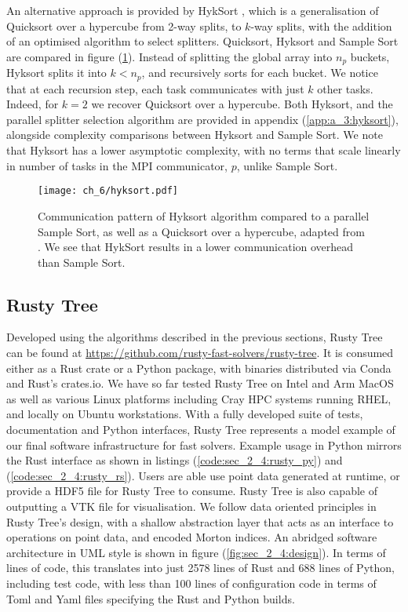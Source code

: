 An alternative approach is provided by HykSort \cite{sundar2013hyksort}, which is a generalisation of Quicksort over a hypercube \cite{wagar1987hyperquicksort} from 2-way splits, to $k$-way splits, with the addition of an optimised algorithm to select splitters. Quicksort, Hyksort and Sample Sort are compared in figure (\ref{fig:sec_2_4:hyksort}). Instead of splitting the global array into $n_p$ buckets, Hyksort splits it into $k < n_p$, and recursively sorts for each bucket. We notice that at each recursion step, each task communicates with just $k$ other tasks. Indeed, for $k=2$ we recover Quicksort over a hypercube. Both Hyksort, and the parallel splitter selection algorithm are provided in appendix (\ref{app:a_3:hyksort}), alongside complexity comparisons between Hyksort and Sample Sort. We note that Hyksort has a lower asymptotic complexity, with no terms that scale linearly in number of tasks in the MPI communicator, $p$, unlike Sample Sort.

\begin{figure}
    \centerline{\texttt{[image: ch\_6/hyksort.pdf]}}
    \caption{Communication pattern of Hyksort algorithm compared to a parallel Sample Sort, as well as a Quicksort over a hypercube, adapted from \cite{sundar2013hyksort}. We see that HykSort results in a lower communication overhead than Sample Sort.}
    \label{fig:sec_2_4:hyksort}
\end{figure}

\subsection*{Rusty Tree}

Developed using the algorithms described in the previous sections, Rusty Tree can be found at \url{https://github.com/rusty-fast-solvers/rusty-tree}. It is consumed either as a Rust crate or a Python package, with binaries distributed via Conda and Rust's crates.io. We have so far tested Rusty Tree on Intel and Arm MacOS as well as various Linux platforms including Cray HPC systems running RHEL, and locally on Ubuntu workstations. With a fully developed suite of tests, documentation and Python interfaces, Rusty Tree represents a model example of our final software infrastructure for fast solvers. Example usage in Python mirrors the Rust interface as shown in listings (\ref{code:sec_2_4:rusty_py}) and (\ref{code:sec_2_4:rusty_rs}). Users are able use point data generated at runtime, or provide a HDF5 file for Rusty Tree to consume. Rusty Tree is also capable of outputting a VTK file for visualisation.  We follow data oriented principles in Rusty Tree's design, with a shallow abstraction layer that acts as an interface to operations on point data, and encoded Morton indices. An abridged software architecture in UML style is shown in figure (\ref{fig:sec_2_4:design}). In terms of lines of code, this translates into just 2578 lines of Rust and 688 lines of Python, including test code, with less than 100 lines of configuration code in terms of Toml and Yaml files specifying the Rust and Python builds.

